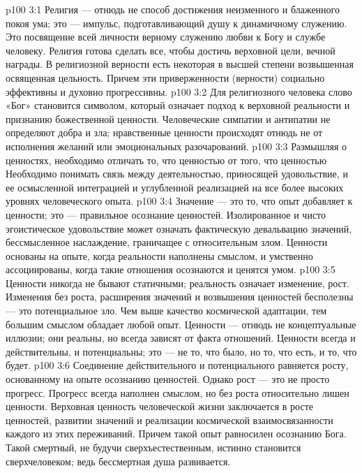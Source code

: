 \vs p100 3:1 Религия --- отнюдь не способ достижения неизменного и блаженного покоя ума; это --- импульс, подготавливающий душу к динамичному служению. Это посвящение всей личности верному служению любви к Богу и службе человеку. Религия готова сделать все, чтобы достичь верховной цели, вечной награды. В религиозной верности есть некоторая в высшей степени возвышенная освященная цельность. Причем эти приверженности (верности) социально эффективны и духовно прогрессивны.
\vs p100 3:2 Для религиозного человека слово «Бог» становится символом, который означает подход к верховной реальности и признанию божественной ценности. Человеческие симпатии и антипатии не определяют добра и зла; нравственные ценности происходят отнюдь не от исполнения желаний или эмоциональных разочарований.
\vs p100 3:3 Размышляя о ценностях, необходимо отличать то, что ценностью  от того, что ценностью  Необходимо понимать связь между деятельностью, приносящей удовольствие, и ее осмысленной интеграцией и углубленной реализацией на все более высоких уровнях человеческого опыта.
\vs p100 3:4 \pc Значение --- это то, что опыт добавляет к ценности; это --- правильное осознание ценностей. Изолированное и чисто эгоистическое удовольствие может означать фактическую девальвацию значений, бессмысленное наслаждение, граничащее с относительным злом. Ценности основаны на опыте, когда реальности наполнены смыслом, и умственно ассоциированы, когда такие отношения осознаются и ценятся умом.
\vs p100 3:5 \pc Ценности никогда не бывают статичными; реальность означает изменение, рост. Изменения без роста, расширения значений и возвышения ценностей бесполезны --- это потенциальное зло. Чем выше качество космической адаптации, тем большим смыслом обладает любой опыт. Ценности --- отнюдь не концептуальные иллюзии; они реальны, но всегда зависят от факта отношений. Ценности всегда и действительны, и потенциальны; это --- не то, что было, но то, что есть, и то, что будет.
\vs p100 3:6 Соединение действительного и потенциального равняется росту, основанному на опыте осознанию ценностей. Однако рост --- это не просто прогресс. Прогресс всегда наполнен смыслом, но без роста относительно лишен ценности. Верховная ценность человеческой жизни заключается в росте ценностей, развитии значений и реализации космической взаимосвязанности каждого из этих переживаний. Причем такой опыт равносилен осознанию Бога. Такой смертный, не будучи сверхъестественным, истинно становится сверхчеловеком; ведь бессмертная душа развивается.
